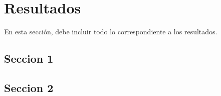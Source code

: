 \chapter{Resultados}

En esta sección, debe incluir todo lo correspondiente a los resultados.

\section{Seccion 1}

\section{Seccion 2}